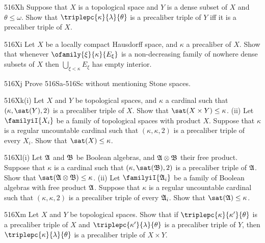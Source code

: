 {\spheader 516Xh Suppose that $X$ is a topological space and $Y$ is a
dense subset of $X$ and $\theta\le\omega$.   Show that
$\triplepc{\kappa}{\lambda}{\theta}$ is a precaliber triple of $Y$  iff
it is a precaliber triple of $X$.

\spheader 516Xi Let $X$ be a locally compact Hausdorff space, and
$\kappa$ a precaliber of $X$.   Show that whenever
$\ofamily{\xi}{\kappa}{E_{\xi}}$ is a
non-decreasing family of nowhere dense subsets of $X$ then
$\bigcup_{\xi<\kappa}E_{\xi}$ has empty interior.

\spheader 516Xj Prove 516Sa-516Sc without mentioning Stone spaces.

\spheader 516Xk(i) Let $X$ and $Y$ be topological spaces, and $\kappa$
a cardinal such that $(\kappa,\sat(Y),2)$ is a
precaliber triple of $X$.   Show that
$\sat(X\times Y)\le\kappa$.
(ii) Let $\familyiI{X_i}$ be a family of topological spaces
with product $X$.   Suppose that
$\kappa$ is a regular uncountable
cardinal such that $(\kappa,\kappa,2)$ is a
precaliber triple of every $X_i$.   Show that
$\sat(X)\le\kappa$.

\spheader 516Xl(i) Let $\frak A$ and $\frak B$ be Boolean algebras, and
$\frak A\otimes\frak B$ their free product.   Suppose that $\kappa$ is a
cardinal such that $(\kappa,\sat(\frak B),2)$ is a
precaliber triple of $\frak A$.   Show that
$\sat(\frak A\otimes\frak B)\le\kappa$.
(ii) Let $\familyiI{\frak A_i}$ be a family of Boolean algebras
with free product $\frak A$.   Suppose that
$\kappa$ is a regular uncountable
cardinal such that $(\kappa,\kappa,2)$ is a
precaliber triple of every $\frak A_i$.   Show that
$\sat(\frak A)\le\kappa$.

\spheader 516Xm Let $X$ and $Y$ be topological spaces.   Show that if
$\triplepc{\kappa}{\kappa'}{\theta}$ is a precaliber triple of $X$ and
$\triplepc{\kappa'}{\lambda}{\theta}$ is a precaliber triple of $Y$,
then $\triplepc{\kappa}{\lambda}{\theta}$ is a precaliber triple of
$X\times Y$.

}%

